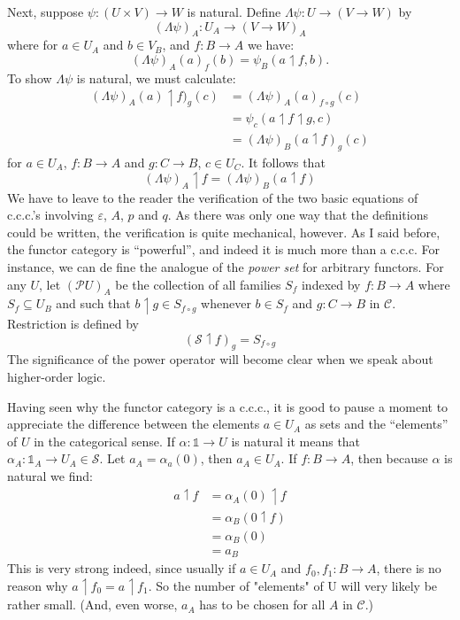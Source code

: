 \documentclass[12pt]{article}
\def\to{\rightarrow}
\def\res{\!\upharpoonleft\!}
\def\comp{\circ}
\def\bbone{\mathbb 1}
\def\ccc{{c.c.c.}}
\def\ev{\varepsilon}
\def\L{\Lambda}
\def\C{\mathcal C}
\def\S{\mathcal S}
\def\PU{\mathcal P U}
\begin{document}
Next, suppose $\psi: (U \times V) \to W$ is natural. Define
$\L \psi  : U\to (V\to W)$ by
%
$$
(\L \psi)_A: U_A \to (V \to W)_A
$$
%
where for $a \in U_A$ and $b \in V_B$, and $f: B \to A$ we have:
$$
(\L \psi)_A (a)_f (b) = \psi_B (a \res f, b).
$$
To show $\L\psi$ is natural, we must calculate:
\begin{align*}
(\L \psi)_A (a)\res f)_g (c) &= (\L \psi)_A(a)_{f \comp g} (c)\\
&= \psi_c(a \res f \res g,c)\\
&= (\L \psi)_B(a \res f)_g (c)
\end{align*}
%
for $a \in U_A$, $f : B \to A$ and $g: C\to B$, $c \in U_C$. It follows that
$$
(\L \psi)_A \res f = (\L \psi)_B (a \res f)
$$
%
We have to leave to the reader the verification of the two ba­sic equations of \ccc's involving $\ev$, $A$, $p$ and $q$. As there was only one way that the definitions could be written, the verification is quite mechanical, however.
As I said before, the functor category is ``powerful'', and indeed it is much more than a c.c.c. For instance, we can de­ fine the analogue of the {\it power set} for arbitrary functors. For any $U$, let $(\PU)_A$ be the collection of all families $S_f$ indexed by $f: B\to A$ where $S_f \subseteq U_B$ and such that $b\res g \in S_{f \comp g}$ whenever $b\in S_f$ and $g: C\to B$ in $\C$. Restriction is defined by
$$
(\S \res f)_g = S_{f \comp g}
$$
%
The significance of the power operator will become clear when we speak about higher-order logic.

Having seen why the functor category is a \ccc, it is good to pause a moment to appreciate the difference between the ele­ments $a \in U_A$ as sets and the ``elements'' of $U$ in the categorical sense. If $\alpha : \bbone \to U$ is natural it means that $\alpha_A  : \bbone_A  \to U_A \in \S$. Let $a_A = \alpha_a(0)$, then $a_A \in U_A$. If $f:B\to A$, then because $\alpha$ is natural we find:
\begin{align*}
a \res f &= \alpha_A(0) \res f\\
&= \alpha_B(0 \res f)\\
&= \alpha_B(0)\\
&= a_B
\end{align*}
This is very strong indeed, since usually if $a \in U_A$ and $f_0, f_1 :B\to A$, there is no reason why $a \res f_0 = a \res f_1$.
So the number of "elements" of U will very likely be rather small. (And, even worse, $a_A$ has to be chosen for all $A$ in $\C$.)
\end{document}

